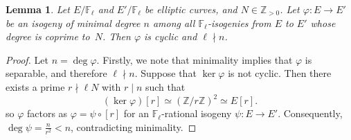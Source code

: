 \documentclass[12pt]{amsart}
\numberwithin{equation}{section}
\newtheorem{lemma}[equation]{Lemma}
\theoremstyle{definition}
\newcommand{\F}{\mathbb{F}}
\newcommand{\Z}{\mathbb{Z}}
\begin{document}
\begin{lemma}\label{lem:cyclic-isog}
   Let $E/\F_\ell$ and $E'/\F_\ell$ be elliptic curves, and $N\in\Z_{>0}$. Let $\varphi: E\to E'$ be an isogeny of minimal degree $n$ among all $\F_\ell$-isogenies from $E$ to $E'$ whose degree is coprime to~$N$. Then $\varphi$ is cyclic and $\ell \nmid n$.
\end{lemma}
\begin{proof}
Let $n=\deg \varphi$.
    Firstly, we note that minimality implies that $\varphi$ is separable, and therefore $\ell \nmid n$. 
Suppose that $\ker\varphi$ is not cyclic. Then there exists a prime $r\nmid\ell N$ with  $r\mid n$ such that \[ (\ker\varphi)[r]\simeq (\Z/r\Z)^2 \simeq E[r]. \]
so $\varphi$ factors as $ \varphi=\psi\circ[r] $ for an $\F_\ell$-rational isogeny $\psi: E\to E'$. Consequently, $\deg\psi=\frac{n}{r^2}<n$, contradicting minimality.
\end{proof}
\end{document}
